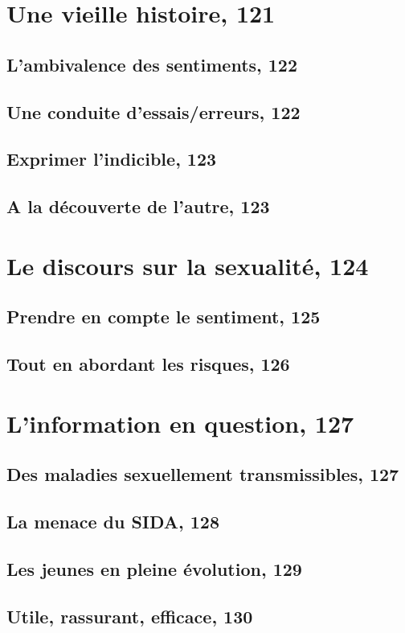 \documentclass[12pt]{report}
\begin{document}
\begin{itemize}
\section{Une vieille histoire, 121}
\subsection{L'ambivalence des sentiments, 122}
\subsection{Une conduite d'essais/erreurs, 122}
\subsection{Exprimer l'indicible, 123}
\subsection{A la découverte de l'autre, 123}
\section{Le discours sur la sexualité, 124}
\subsection{Prendre en compte le sentiment, 125}
\subsection{Tout en abordant les risques, 126}
\section{L'information en question, 127}
\subsection{Des maladies sexuellement transmissibles, 127}
\subsection{La menace du SIDA, 128}
\subsection{Les jeunes en pleine évolution, 129}
\subsection{Utile, rassurant, efficace, 130}

\end{itemize}
\end{document}
